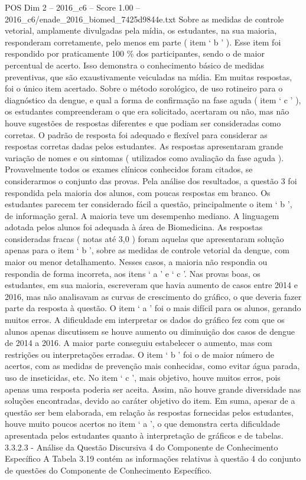 \begin{textsample}{POS Dim 2 – 2016\_c6 – Score 1.00 – 2016\_c6/enade\_2016\_biomed\_7425d9844e.txt}
Sobre as medidas de controle vetorial, amplamente divulgadas pela mídia, os estudantes, na sua maioria, responderam corretamente, pelo menos em parte ( item ‘ b ’ ).
Esse item foi respondido por praticamente 100 \% dos participantes, sendo o de maior percentual de acerto.
Isso demonstra o conhecimento básico de medidas preventivas, que são exaustivamente veiculadas na mídia.
Em muitas respostas, foi o único item acertado.
Sobre o método sorológico, de uso rotineiro para o diagnóstico da dengue, e qual a forma de confirmação na fase aguda ( item ‘ c ’ ), os estudantes compreenderam o que era solicitado, acertaram ou não, mas não houve sugestões de respostas diferentes e que podiam ser consideradas como corretas.
O padrão de resposta foi adequado e flexível para considerar as respostas corretas dadas pelos estudantes.
As respostas apresentaram grande variação de nomes e ou sintomas ( utilizados como avaliação da fase aguda ).
Provavelmente todos os exames clínicos conhecidos foram citados, se considerarmos o conjunto das provas.
Pela análise dos resultados, a questão 3 foi respondida pela maioria dos alunos, com poucas respostas em branco.
Os estudantes parecem ter considerado fácil a questão, principalmente o item ‘ b ’, de informação geral.
A maioria teve um desempenho mediano.
A linguagem adotada pelos alunos foi adequada à área de Biomedicina.
As respostas consideradas fracas ( notas até 3,0 ) foram aquelas que apresentaram solução apenas para o item ‘ b ’, sobre as medidas de controle vetorial da dengue, com maior ou menor detalhamento.
Nesses casos, a maioria não respondia ou respondia de forma incorreta, aos itens ‘ a ’ e ‘ c ’.
Nas provas boas, os estudantes, em sua maioria, escreveram que havia aumento de casos entre 2014 e 2016, mas não analisavam as curvas de crescimento do gráfico, o que deveria fazer parte da resposta à questão.
O item ‘ a ’ foi o mais difícil para os alunos, gerando muitos erros.
A dificuldade em interpretar os dados do gráfico fez com que os alunos apenas discutissem se houve aumento ou diminuição dos casos de dengue de 2014 a 2016.
A maior parte conseguiu estabelecer o aumento, mas com restrições ou interpretações erradas.
O item ‘ b ’ foi o de maior número de acertos, com as medidas de prevenção mais conhecidas, como evitar água parada, uso de inseticidas, etc.
No item ‘ c ’, mais objetivo, houve muitos erros, pois apenas uma resposta poderia ser aceita.
Assim, não houve grande diversidade nas soluções encontradas, devido ao caráter objetivo do item.
Em suma, apesar de a questão ser bem elaborada, em relação às respostas fornecidas pelos estudantes, houve muito poucos acertos no item ‘ a ’, o que demonstra certa dificuldade apresentada pelos estudantes quanto à interpretação de gráficos e de tabelas. 3.3.2.3 - Análise da Questão Discursiva 4 do Componente de Conhecimento Específico A Tabela 3.19 contém as informações relativas à questão 4 do conjunto de questões do Componente de Conhecimento Específico.

\end{textsample}
